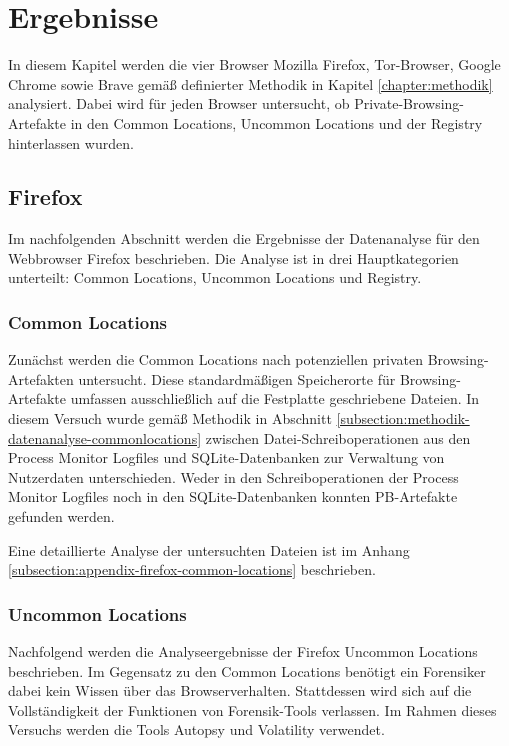 \chapter{Ergebnisse}
\label{chapter:ergebnisse}

In diesem Kapitel werden die vier Browser Mozilla Firefox, Tor-Browser, Google Chrome sowie Brave gemäß definierter Methodik in Kapitel \ref{chapter:methodik} analysiert. Dabei wird für jeden Browser untersucht, ob Private-Browsing-Artefakte in den Common Locations, Uncommon Locations und der Registry hinterlassen wurden. 


\section{Firefox}
\label{section:ergebnisse-firefox}
Im nachfolgenden Abschnitt werden die Ergebnisse der Datenanalyse für den Webbrowser Firefox beschrieben. Die Analyse ist in drei Hauptkategorien unterteilt: Common Locations, Uncommon Locations und Registry.

\subsection*{Common Locations}
\label{subsection:ergebnisse-firefox-commonlocations}
Zunächst werden die Common Locations nach potenziellen privaten Browsing-Artefakten untersucht. Diese standardmäßigen Speicherorte für Browsing-Artefakte umfassen ausschließlich auf die Festplatte geschriebene Dateien. In diesem Versuch wurde gemäß Methodik in Abschnitt \ref{subsection:methodik-datenanalyse-commonlocations} zwischen Datei-Schreiboperationen aus den Process Monitor Logfiles und SQLite-Datenbanken zur Verwaltung von Nutzerdaten unterschieden. Weder in den Schreiboperationen der Process Monitor Logfiles noch in den SQLite-Datenbanken konnten PB-Artefakte gefunden werden. 

Eine detaillierte Analyse der untersuchten Dateien ist im Anhang \ref{subsection:appendix-firefox-common-locations} beschrieben.

\subsection*{Uncommon Locations}
\label{subsection:ergebnisse-firefox-uncommonlocations}
Nachfolgend werden die Analyseergebnisse der Firefox Uncommon Locations beschrieben.
Im Gegensatz zu den Common Locations benötigt ein Forensiker dabei kein Wissen über das Browserverhalten. Stattdessen wird sich auf die Vollständigkeit der Funktionen von Forensik-Tools verlassen. Im Rahmen dieses Versuchs werden die Tools Autopsy und Volatility verwendet.

